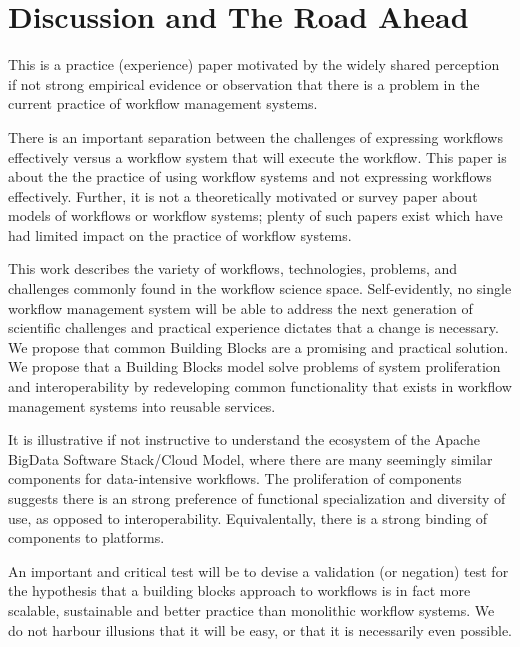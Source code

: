 \section{Discussion and The Road Ahead}\label{discussion}

This is a practice (experience) paper motivated by the widely shared
perception if not strong empirical evidence or observation that there is a
problem in the current practice of workflow management systems.

There is an important separation between the challenges of expressing workflows
effectively versus a workflow system that will execute the
workflow. This paper is about the  the practice of using workflow
systems and not expressing workflows effectively. Further, it is not a
theoretically motivated or survey paper about models of workflows or workflow
systems; plenty of such papers exist which have had limited impact on the
practice of workflow systems. 

This work describes the variety of workflows, technologies, problems, and
challenges commonly found in the workflow science space.  Self-evidently, no
single workflow management system will be able to address the next generation
of scientific challenges and practical experience dictates that a change is
necessary. We propose  that common Building Blocks are a promising and
practical solution. We propose that a Building Blocks model solve problems of
system proliferation and interoperability by redeveloping common functionality
that exists in workflow management systems into reusable services.

It is illustrative if not instructive to understand the ecosystem of the
Apache BigData Software Stack/Cloud Model, where there are many seemingly
similar components for  data-intensive workflows. The proliferation of
components suggests there is an strong preference of functional specialization
and diversity of use, as opposed to interoperability.  Equivalentally, there
is a strong binding of components to platforms.

An important and critical test will be to devise a validation (or negation)
test for the hypothesis that a building blocks approach to workflows is in fact
more scalable, sustainable and better practice than monolithic workflow
systems. We do not harbour illusions that it will be easy, or that it is
necessarily even possible.

